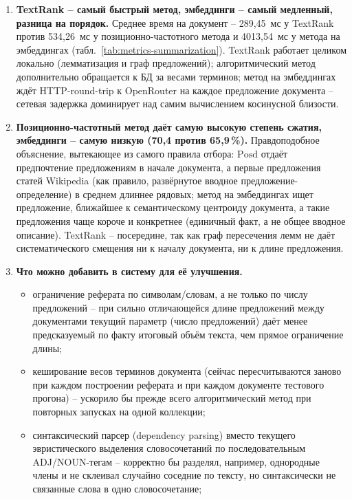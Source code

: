 \begin{enumerate}
  \item \textbf{TextRank -- самый быстрый метод, эмбеддинги -- самый
  медленный, разница на порядок.} Среднее время на документ --
  289{,}45~мс у TextRank против 534{,}26~мс у позиционно-частотного метода и
  4013{,}54~мс у метода на эмбеддингах (табл.~\ref{tab:metrics-summarization}).
  TextRank работает целиком локально (лемматизация и граф
  предложений); алгоритмический метод дополнительно обращается к БД за
  весами терминов; метод на эмбеддингах ждёт HTTP-round-trip к
  OpenRouter на каждое предложение документа -- сетевая задержка
  доминирует над самим вычислением косинусной близости.
  \item \textbf{Позиционно-частотный метод даёт самую высокую степень
  сжатия, эмбеддинги -- самую низкую (70{,}4 против 65{,}9\,\%).}
  Правдоподобное объяснение, вытекающее из самого правила отбора:
  $\mathrm{Posd}$ отдаёт предпочтение предложениям в начале документа,
  а первые предложения статей Wikipedia (как правило, развёрнутое
  вводное предложение-определение) в среднем длиннее рядовых; метод на
  эмбеддингах ищет предложение, ближайшее к семантическому центроиду
  документа, а такие предложения чаще короче и конкретнее (единичный
  факт, а не общее вводное описание). TextRank -- посередине, так как
  граф пересечения лемм не даёт систематического смещения ни к началу
  документа, ни к длине предложения.
  \item \textbf{Что можно добавить в систему для её улучшения.}
  \begin{itemize}
    \item ограничение реферата по символам/словам, а не только по
    числу предложений -- при сильно отличающейся длине предложений
    между документами текущий параметр (число предложений) даёт менее
    предсказуемый по факту итоговый объём текста, чем прямое
    ограничение длины;
    \item кеширование весов терминов документа (сейчас пересчитываются
    заново при каждом построении реферата и при каждом документе
    тестового прогона) -- ускорило бы прежде всего алгоритмический
    метод при повторных запусках на одной коллекции;
    \item синтаксический парсер (dependency parsing) вместо текущего
    эвристического выделения словосочетаний по последовательным
    ADJ/NOUN-тегам -- корректно бы разделял, например, однородные
    члены и не склеивал случайно соседние по тексту, но синтаксически
    не связанные слова в одно словосочетание;

\end{itemize}
\end{enumerate}
